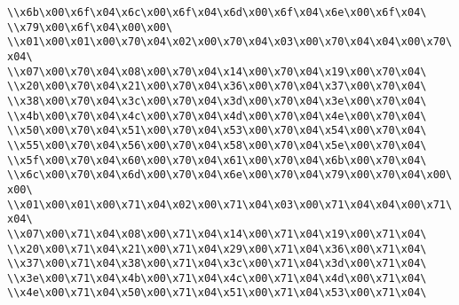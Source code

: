 \verb|\\x6b\x00\x6f\x04\x6c\x00\x6f\x04\x6d\x00\x6f\x04\x6e\x00\x6f\x04\|\newline
\verb|\\x79\x00\x6f\x04\x00\x00\|\newline
\verb|\\x01\x00\x01\x00\x70\x04\x02\x00\x70\x04\x03\x00\x70\x04\x04\x00\x70\x04\|\newline
\verb|\\x07\x00\x70\x04\x08\x00\x70\x04\x14\x00\x70\x04\x19\x00\x70\x04\|\newline
\verb|\\x20\x00\x70\x04\x21\x00\x70\x04\x36\x00\x70\x04\x37\x00\x70\x04\|\newline
\verb|\\x38\x00\x70\x04\x3c\x00\x70\x04\x3d\x00\x70\x04\x3e\x00\x70\x04\|\newline
\verb|\\x4b\x00\x70\x04\x4c\x00\x70\x04\x4d\x00\x70\x04\x4e\x00\x70\x04\|\newline
\verb|\\x50\x00\x70\x04\x51\x00\x70\x04\x53\x00\x70\x04\x54\x00\x70\x04\|\newline
\verb|\\x55\x00\x70\x04\x56\x00\x70\x04\x58\x00\x70\x04\x5e\x00\x70\x04\|\newline
\verb|\\x5f\x00\x70\x04\x60\x00\x70\x04\x61\x00\x70\x04\x6b\x00\x70\x04\|\newline
\verb|\\x6c\x00\x70\x04\x6d\x00\x70\x04\x6e\x00\x70\x04\x79\x00\x70\x04\x00\x00\|\newline
\verb|\\x01\x00\x01\x00\x71\x04\x02\x00\x71\x04\x03\x00\x71\x04\x04\x00\x71\x04\|\newline
\verb|\\x07\x00\x71\x04\x08\x00\x71\x04\x14\x00\x71\x04\x19\x00\x71\x04\|\newline
\verb|\\x20\x00\x71\x04\x21\x00\x71\x04\x29\x00\x71\x04\x36\x00\x71\x04\|\newline
\verb|\\x37\x00\x71\x04\x38\x00\x71\x04\x3c\x00\x71\x04\x3d\x00\x71\x04\|\newline
\verb|\\x3e\x00\x71\x04\x4b\x00\x71\x04\x4c\x00\x71\x04\x4d\x00\x71\x04\|\newline
\verb|\\x4e\x00\x71\x04\x50\x00\x71\x04\x51\x00\x71\x04\x53\x00\x71\x04\|\newline
